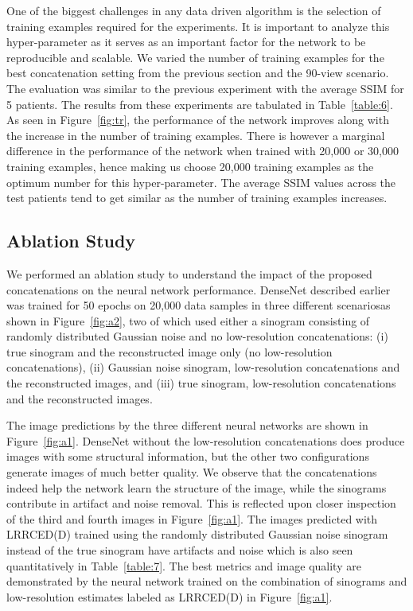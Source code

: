 One of the biggest challenges in any data driven algorithm is the selection of training examples required for the experiments. It is important to analyze this hyper-parameter as it serves as an important factor for the network to be reproducible and scalable. We varied the number of training examples for the best concatenation setting from the previous section and the 90-view scenario. The evaluation was similar to the previous experiment with the average \ac{SSIM} for 5 patients. The results from these experiments are tabulated in Table~\ref{table:6}. As seen in Figure~\ref{fig:tr}, the performance of the network improves along with the increase in the number of training examples. There is however a marginal difference in the performance of the network when trained with 20,000 or 30,000 training examples, hence making us choose 20,000 training examples as the optimum number for this hyper-parameter. The average \ac{SSIM} values across the test patients tend to get similar as the number of training examples increases.

\subsection{Ablation Study} \label{sec:ablation}

We performed an ablation study to understand the impact of the proposed concatenations on the neural network performance. DenseNet described earlier was trained for 50 epochs on 20,000 data samples in three different scenariosas shown in Figure~\ref{fig:a2}, two of which used either a sinogram consisting of randomly distributed Gaussian noise and no low-resolution concatenations: (i) true sinogram and the reconstructed image only (no low-resolution concatenations), (ii) Gaussian noise sinogram, low-resolution concatenations and the reconstructed images, and (iii) true sinogram, low-resolution concatenations and the reconstructed images. 

The image predictions by the three different neural networks are shown in Figure~\ref{fig:a1}. DenseNet without the low-resolution concatenations does produce images with some structural information, but the other two configurations generate images of much better quality. We observe that the concatenations indeed help the network learn the structure of the image, while the sinograms contribute in artifact and noise removal. This is reflected upon closer inspection of the third and fourth images in Figure~\ref{fig:a1}. The images predicted with \ac{LRRCED}(D) trained using the randomly distributed Gaussian noise sinogram instead of the true sinogram have artifacts and noise which is also seen quantitatively in Table~\ref{table:7}. The best metrics and image quality are demonstrated by the neural network trained on the combination of sinograms and low-resolution estimates labeled as \ac{LRRCED}(D) in Figure~\ref{fig:a1}. 



